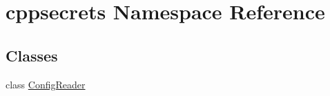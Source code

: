 \hypertarget{namespacecppsecrets}{\section{cppsecrets Namespace Reference}
\label{namespacecppsecrets}
}
\subsection*{Classes}
\begin{DoxyCompactItemize}
\item 
class \hyperlink{classcppsecrets_1_1ConfigReader}{Config\-Reader}
\end{DoxyCompactItemize}
